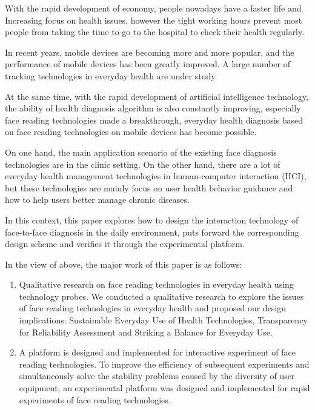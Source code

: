 \documentclass[type=master]{fduthesis}
\begin{document}
\begin{abstract*}

With the rapid development of economy, people nowadays have a faster life and Increasing focus on health issues, however the tight working hours prevent most people from taking the time to go to the hospital to check their health regularly.

In recent years, mobile devices are becoming more and more popular, and the performance of mobile devices has been greatly improved. A large number of tracking technologies in everyday health are under study.
  
At the same time, with the rapid development of artificial intelligence technology, the ability of health diagnosis algorithm is also constantly improving, especially face reading technologies made a breakthrough, everyday health diagnosis based on face reading technologies on mobile devices has become possible.
  
  
On one hand, the main application scenario of the existing face diagnosis technologies are in the clinic setting. On the other hand, there are a lot of everyday health management technologies in human-computer interaction (HCI), but these technologies are mainly focus on user health behavior guidance and how to help users better manage chronic diseases.
  
In this context, this paper explores how to design the interaction technology of face-to-face diagnosis in the daily environment, puts forward the corresponding design scheme and verifies it through the experimental platform.
  
In the view of above, the major work of this paper is as follows:
  
  \begin{enumerate}
  
  \item Qualitative research on face reading technologies in everyday health using technology probes.
We conducted a qualitative research to explore the issues of face reading technologies in everyday health and proposed our design implications: Sustainable Everyday Use of Health Technologies, Transparency for Reliability Assessment and Striking a Balance for Everyday Use.
  
  \item A platform is designed and implemented for interactive experiment of face reading technologies.
To improve the efficiency of subsequent experiments and simultaneously solve the stability problems caused by the diversity of user equipment, an experimental platform was designed and implemented for rapid experiments of face reading technologies.
  

\end{enumerate}
\end{abstract*}
\end{document}
